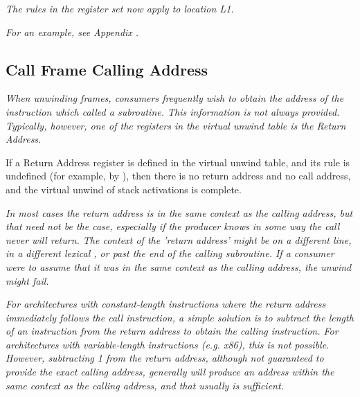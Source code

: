 \textit{The rules in the register set now apply to location L1.}

\textit{For an example, see 
Appendix .}



\subsection{Call Frame Calling Address}
\label{chap:callframecallingaddress}

\textit{When unwinding frames, consumers frequently wish to obtain the
address of the instruction which called a subroutine. This
information is not always provided. Typically, however,
one of the registers in the virtual unwind table is the
Return Address.}

If a Return Address register is defined in the virtual
unwind table, and its rule is undefined (for example, by
), then there is no return address and no
call address, and the virtual unwind of stack activations
is complete.

\textit{In most cases the return address is in the same context as the
calling address, but that need not be the case, especially if
the producer knows in some way the call never will return. The
context of the 'return address' might be on a different line,
in a different lexical , 
or past the end of the calling
subroutine. If a consumer were to assume that it was in the
same context as the calling address, the unwind might fail.}

\textit{For architectures with constant-length instructions where
the return address immediately follows the call instruction,
a simple solution is to subtract the length of an instruction
from the return address to obtain the calling instruction. For
architectures with variable-length instructions (e.g.  x86),
this is not possible. However, subtracting 1 from the return
address, although not guaranteed to provide the exact calling
address, generally will produce an address within the same
context as the calling address, and that usually is sufficient.}



